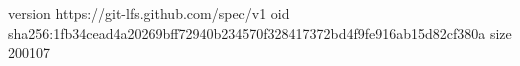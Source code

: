 version https://git-lfs.github.com/spec/v1
oid sha256:1fb34cead4a20269bff72940b234570f328417372bd4f9fe916ab15d82cf380a
size 200107
